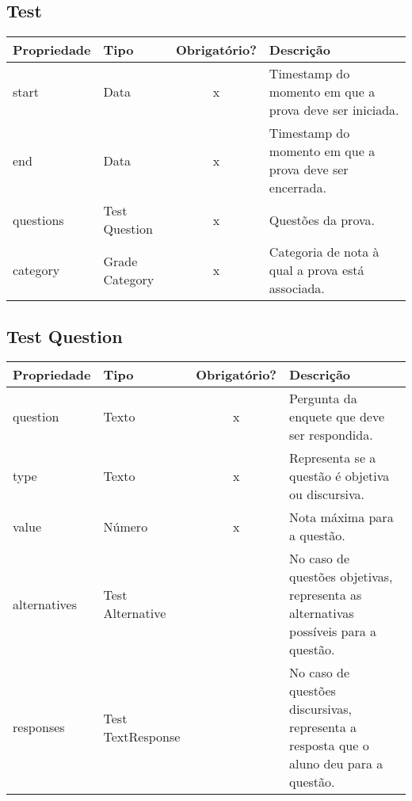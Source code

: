 \subsection{Test} \label{Test}
\begin{table}[H]
	\footnotesize
	\begin{tabularx}{\textwidth}{|X|X|c|p{7.8cm}|}   \hline \rowcolor[rgb]{0.8,0.8,0.8}
		
		\textbf{Propriedade} & \textbf{Tipo} & \textbf{Obrigatório?} & \centerline{\textbf{Descrição}} \\\hline  	
		
		start & Data & x & Timestamp do momento em que a prova deve ser iniciada. \\\hline			
		end & Data & x & Timestamp do momento em que a prova deve ser encerrada. \\\hline
		questions & Test Question & x & Questões da prova.			\\\hline
		category & Grade Category & x & Categoria de nota à qual a prova está associada. \\\hline
		
		
	\end{tabularx}	
\end{table}



\subsection{Test Question} \label{Test Question}
\begin{table}[H]
	\footnotesize
	\begin{tabularx}{\textwidth}{|X|X|c|p{7.8cm}|}   \hline \rowcolor[rgb]{0.8,0.8,0.8}
		
		\textbf{Propriedade} & \textbf{Tipo} & \textbf{Obrigatório?} & \centerline{\textbf{Descrição}} \\\hline  	
		
		question & Texto & x & Pergunta da enquete que deve ser respondida. \\\hline		
		type & Texto & x & Representa se a questão é objetiva ou discursiva. \\\hline		
		value & Número & x & Nota máxima para a questão. \\\hline		
		alternatives & Test Alternative & {} & No caso de questões objetivas, representa as alternativas possíveis para a questão. \\\hline
		responses & Test TextResponse & {} & No caso de questões discursivas, representa a resposta que o aluno deu para a questão. \\\hline
		
	\end{tabularx}	
\end{table}

